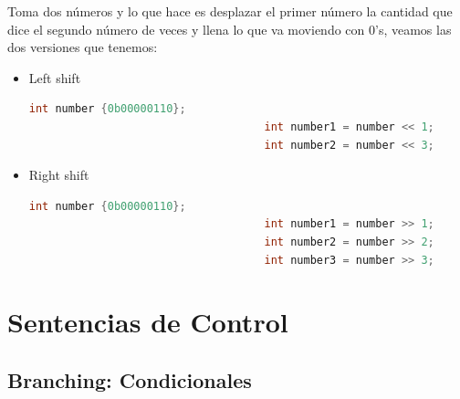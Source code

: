 \documentclass[12pt, fleqn]{report}                             %
\theoremstyle{break}                                            %
\begin{document}
\begin{itemize}
                        Toma dos números y lo que hace es desplazar el primer número la cantidad que dice el 
                        segundo número de veces y llena lo que va moviendo con 0's, 
                        veamos las dos versiones que tenemos: 
                        \begin{itemize}
                            \item Left shift
                                \begin{lstlisting}[language=C++, gobble=36]
                                    int number {0b00000110};
                                    int number1 = number << 1;      // 0b00001100
                                    int number2 = number << 3;      // 0b00110000
                                \end{lstlisting}

                            \item Right shift
                                \begin{lstlisting}[language=C++, gobble=36]
                                    int number {0b00000110};
                                    int number1 = number >> 1;      // 0b00000011
                                    int number2 = number >> 2;      // 0b00000001
                                    int number3 = number >> 3;      // 0b00000000
                                \end{lstlisting}

                        \end{itemize}
                    
                \end{itemize}



        \clearpage
        \section{Sentencias de Control}

            \subsection{Branching: Condicionales}
\end{document}
